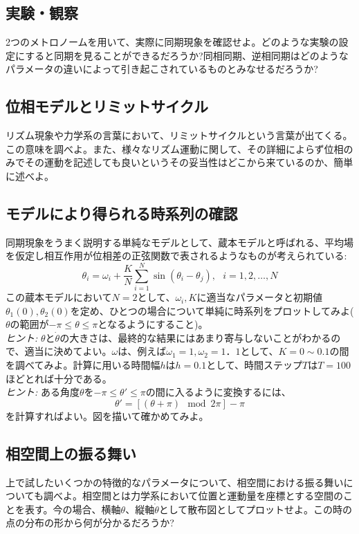 \documentclass{jsarticle}
\begin{document}
\subsection{実験・観察}
    2つのメトロノームを用いて、実際に同期現象を確認せよ。どのような実験の設定にすると同期を見ることができるだろうか?同相同期、逆相同期はどのようなパラメータの違いによって引き起こされているものとみなせるだろうか?

\subsection{位相モデルとリミットサイクル}
    リズム現象や力学系の言葉において、リミットサイクルという言葉が出てくる。この意味を調べよ。また、様々なリズム運動に関して、その詳細によらず位相のみでその運動を記述しても良いというその妥当性はどこから来ているのか、簡単に述べよ。

\subsection{モデルにより得られる時系列の確認}
    同期現象をうまく説明する単純なモデルとして、蔵本モデルと呼ばれる、平均場を仮定し相互作用が位相差の正弦関数で表されるようなものが考えられている:
    $$\theta_{i} = \omega_{i} + \frac{K}{N}\sum_{i=1}^{N}\sin(\theta_{i}-\theta_{j}),\ \ \ i=1,2,\dots ,N$$
    この蔵本モデルにおいて$N=2$として、$\omega_{i},K$に適当なパラメータと初期値$\theta_{1}(0), \theta_{2}(0)$を定め、ひとつの場合について単純に時系列をプロットしてみよ($\theta$の範囲が$-\pi \le \theta \le \pi$となるようにすること)。\\
    \emph{ヒント:}  $\theta$と$\dot{\theta}$の大きさは、最終的な結果にはあまり寄与しないことがわかるので、適当に決めてよい。$\omega$は、例えば$\omega_{1} = 1, \omega_{2} = 1．1$として、$K=0\sim 0.1$の間を調べてみよ。計算に用いる時間幅$h$は$h=0.1$として、時間ステップ$T$は$T=100$ほどとれば十分である。\\
    \emph{ヒント:} ある角度$\theta$を$-\pi \le \theta' \le \pi$の間に入るように変換するには、
    $$\theta' = [(\theta + \pi)\mod 2\pi] - \pi$$
    を計算すればよい。図を描いて確かめてみよ。

\subsection{相空間上の振る舞い}
    上で試したいくつかの特徴的なパラメータについて、相空間における振る舞いについても調べよ。相空間とは力学系において位置と運動量を座標とする空間のことを表す。今の場合、横軸$\theta$、縦軸$\dot{\theta}$として散布図としてプロットせよ。この時の点の分布の形から何が分かるだろうか?
\end{document}
